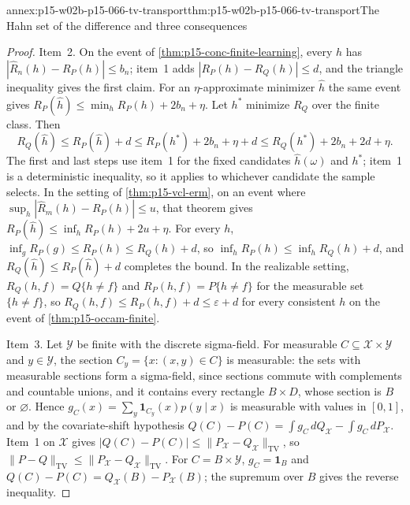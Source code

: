 \begin{annexitem}{annex:p15-w02b-p15-066-tv-transport}{thm:p15-w02b-p15-066-tv-transport}{The Hahn set of the difference and three consequences}
\begin{proof}
Item~2. On the event of \cref{thm:p15-conc-finite-learning}, every
\(h\) has \(|\widehat R_n(h)-R_P(h)|\leq b_n\); item~1 adds
\(|R_P(h)-R_Q(h)|\leq d\), and the triangle inequality gives the first
claim. For an \(\eta\)-approximate minimizer \(\widehat h\) the same
event gives \(R_P(\widehat h)\leq\min_hR_P(h)+2b_n+\eta\). Let
\(h^\ast\) minimize \(R_Q\) over the finite class. Then
\[
 R_Q(\widehat h)\leq R_P(\widehat h)+d
 \leq R_P(h^\ast)+2b_n+\eta+d
 \leq R_Q(h^\ast)+2b_n+2d+\eta .
\]
The first and last steps use item~1 for the fixed candidates
\(\widehat h(\omega)\) and \(h^\ast\); item~1 is a deterministic
inequality, so it applies to whichever candidate the sample selects.
In the setting of \cref{thm:p15-vcl-erm}, on an event where
\(\sup_h|\widehat R_m(h)-R_P(h)|\leq u\), that theorem gives
\(R_P(\widehat h)\leq\inf_hR_P(h)+2u+\eta\). For every \(h\),
\(\inf_gR_P(g)\leq R_P(h)\leq R_Q(h)+d\), so
\(\inf_hR_P(h)\leq\inf_hR_Q(h)+d\), and
\(R_Q(\widehat h)\leq R_P(\widehat h)+d\) completes the bound. In the
realizable setting, \(R_Q(h,f)=Q\{h\ne f\}\) and
\(R_P(h,f)=P\{h\ne f\}\) for the measurable set \(\{h\ne f\}\), so
\(R_Q(h,f)\leq R_P(h,f)+d\leq\varepsilon+d\) for every consistent
\(h\) on the event of \cref{thm:p15-occam-finite}.

Item~3. Let \(\mathcal Y\) be finite with the discrete sigma-field. For
measurable \(C\subseteq\mathcal X\times\mathcal Y\) and \(y\in\mathcal Y\),
the section \(C_y=\{x:(x,y)\in C\}\) is measurable: the sets with
measurable sections form a sigma-field, since sections commute with
complements and countable unions, and it contains every rectangle
\(B\times D\), whose section is \(B\) or \(\varnothing\). Hence
\(g_C(x)=\sum_y\mathbf1_{C_y}(x)p(y\mid x)\) is measurable with values in
\([0,1]\), and by the covariate-shift hypothesis
\(Q(C)-P(C)=\int g_C\,dQ_{\mathcal X}-\int g_C\,dP_{\mathcal X}\).
Item~1 on \(\mathcal X\) gives
\(|Q(C)-P(C)|\leq\|P_{\mathcal X}-Q_{\mathcal X}\|_{\mathrm{TV}}\), so
\(\|P-Q\|_{\mathrm{TV}}\leq\|P_{\mathcal X}-Q_{\mathcal X}\|_{\mathrm{TV}}\).
For \(C=B\times\mathcal Y\), \(g_C=\mathbf1_B\) and
\(Q(C)-P(C)=Q_{\mathcal X}(B)-P_{\mathcal X}(B)\); the supremum over \(B\)
gives the reverse inequality.
\end{proof}
\end{annexitem}

